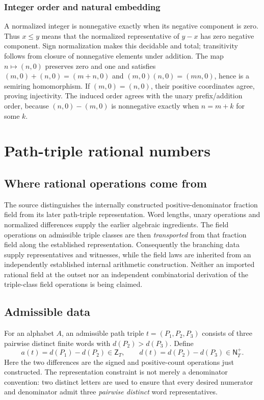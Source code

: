 \documentclass[11pt,reqno]{amsart}
\theoremstyle{definition}\newtheorem{definition}[theorem]{Definition}
\theoremstyle{remark}\newtheorem{remark}[theorem]{Remark}
\newcommand{\N}{\mathsf N_T}\newcommand{\Z}{\mathsf Z_T}\newcommand{\Q}{\mathsf Q_T}\newcommand{\RR}{\mathsf R}
\begin{document}
\medskip
\subsubsection*{Integer order and natural embedding}\label{supp:5-4}
A normalized integer is nonnegative exactly when its negative component is zero. Thus $x\le y$ means that the normalized representative of $y-x$ has zero negative component. Sign normalization makes this decidable and total; transitivity follows from closure of nonnegative elements under addition. The map $n\mapsto(n,0)$ preserves zero and one and satisfies $(m,0)+(n,0)=(m+n,0)$ and $(m,0)(n,0)=(mn,0)$, hence is a semiring homomorphism. If $(m,0)=(n,0)$, their positive coordinates agree, proving injectivity. The induced order agrees with the unary prefix/addition order, because $(n,0)-(m,0)$ is nonnegative exactly when $n=m+k$ for some $k$.
\medskip

\clearpage
\section{Path-triple rational numbers}\label{sec:rationals}
\subsection*{Where rational operations come from}
The source distinguishes the internally constructed positive-denominator fraction field from its later path-triple representation. Word lengths, unary operations and normalized differences supply the earlier algebraic ingredients. The field operations on admissible triple classes are then \emph{transported} from that fraction field along the established representation. Consequently the branching data supply representatives and witnesses, while the field laws are inherited from an independently established internal arithmetic construction. Neither an imported rational field at the outset nor an independent combinatorial derivation of the triple-class field operations is being claimed.


\subsection{Admissible data}\label{main:sub-14}
For an alphabet $A$, an admissible path triple $t=(P_1,P_2,P_3)$ consists of three pairwise distinct finite words with $d(P_2)>d(P_3)$. Define
\[
a(t)=d(P_1)-d(P_2)\in\Z,\qquad d(t)=d(P_2)-d(P_3)\in\N^{+}.
\]
Here the two differences are the signed and positive-count operations just constructed. The representation constraint is not merely a denominator convention: two distinct letters are used to ensure that every desired numerator and denominator admit three \emph{pairwise distinct} word representatives.
\end{document}
